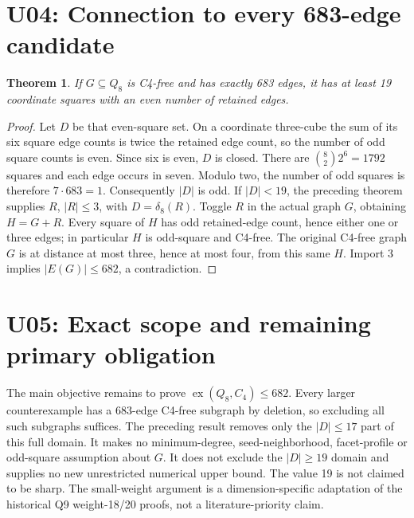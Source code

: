 \documentclass{article}
\newtheorem{theorem}{Theorem}
\begin{document}
\section{U04: Connection to every 683-edge candidate}
\begin{theorem}
If $G\subseteq Q_8$ is C4-free and has exactly 683 edges, it has at least
19 coordinate squares with an even number of retained edges.
\end{theorem}
\begin{proof}
Let $D$ be that even-square set. On a coordinate three-cube the sum of its
six square edge counts is twice the retained edge count, so the number
of odd square counts is even. Since six is even, $D$ is closed.
There are $\binom82 2^6=1792$ squares and each edge occurs in seven.
Modulo two, the number of odd squares is therefore $7\cdot683=1$.
Consequently $|D|$ is odd.
If $|D|<19$, the preceding theorem supplies $R$, $|R|\le3$, with
$D=\delta_8(R)$. Toggle $R$ in the actual graph $G$, obtaining $H=G+R$.
Every square of $H$ has odd retained-edge count, hence either one or
three edges; in particular $H$ is odd-square and C4-free. The original
C4-free graph $G$ is at distance at most three, hence at most four, from
this same $H$. Import 3 implies $|E(G)|\le682$, a contradiction.
\end{proof}

\section{U05: Exact scope and remaining primary obligation}
The main objective remains to prove $\operatorname{ex}(Q_8,C_4)\le682$.
Every larger counterexample has a 683-edge C4-free subgraph by deletion,
so excluding all such subgraphs suffices. The preceding result removes
only the $|D|\le17$ part of this full domain. It makes no minimum-degree,
seed-neighborhood, facet-profile or odd-square assumption about $G$.
It does not exclude the $|D|\ge19$ domain and supplies no new unrestricted
numerical upper bound. The value 19 is not claimed to be sharp.
The small-weight argument is a dimension-specific adaptation of the
historical Q9 weight-18/20 proofs, not a literature-priority claim.
\end{document}
